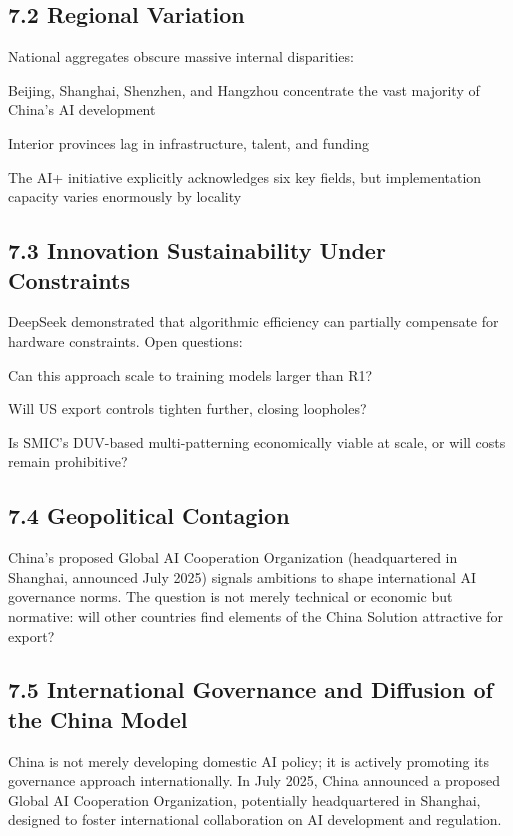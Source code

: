 \documentclass[11pt,a4paper]{article}
\begin{document}
\subsection{7.2 Regional Variation}

National aggregates obscure massive internal disparities:
\item Beijing, Shanghai, Shenzhen, and Hangzhou concentrate the vast majority of China's AI development
\item Interior provinces lag in infrastructure, talent, and funding
\item The AI+ initiative explicitly acknowledges six key fields, but implementation capacity varies enormously by locality

\subsection{7.3 Innovation Sustainability Under Constraints}

DeepSeek demonstrated that algorithmic efficiency can partially compensate for hardware constraints. Open questions:
\item Can this approach scale to training models larger than R1?
\item Will US export controls tighten further, closing loopholes?
\item Is SMIC's DUV-based multi-patterning economically viable at scale, or will costs remain prohibitive?

\subsection{7.4 Geopolitical Contagion}

China's proposed Global AI Cooperation Organization (headquartered in Shanghai, announced July 2025) signals ambitions to shape international AI governance norms. The question is not merely technical or economic but normative: will other countries find elements of the China Solution attractive for export?



\subsection{7.5 International Governance and Diffusion of the China Model}

China is not merely developing domestic AI policy; it is actively promoting its governance approach internationally. In July 2025, China announced a proposed Global AI Cooperation Organization, potentially headquartered in Shanghai, designed to foster international collaboration on AI development and regulation.
\end{document}
